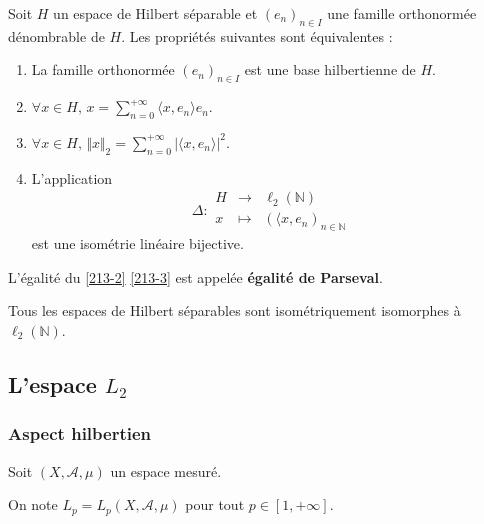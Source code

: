 	\begin{theorem}
		\label{213-2}
		Soit $H$ un espace de Hilbert séparable et $(e_n)_{n \in I}$ une famille orthonormée dénombrable de $H$. Les propriétés suivantes sont équivalentes :
		\begin{enumerate}[label=(\roman*)]
			\item La famille orthonormée $(e_n)_{n \in I}$ est une base hilbertienne de $H$.
			\item $\forall x \in H, \, x = \sum_{n=0}^{+\infty} \langle x, e_n \rangle e_n$.
			\item \label{213-3} $\forall x \in H, \, \Vert x \Vert_2 = \sum_{n=0}^{+\infty} \vert \langle x, e_n \rangle \vert^2$.
			\item L'application
			\[
			\Delta :
			\begin{array}{ccc}
				H &\rightarrow& \ell_2(\mathbb{N}) \\
				x &\mapsto& (\langle x, e_n)_{n \in \mathbb{N}}
			\end{array}
			\]
			est une isométrie linéaire bijective.
		\end{enumerate}
	\end{theorem}

	\begin{remark}
		L'égalité du \cref{213-2} \cref{213-3} est appelée \textbf{égalité de Parseval}.
	\end{remark}


	\begin{corollary}
		Tous les espaces de Hilbert séparables sont isométriquement isomorphes à $\ell_2(\mathbb{N})$.
	\end{corollary}

	\subsection{L'espace \texorpdfstring{$L_2$}{L₂}}

	\subsubsection{Aspect hilbertien}


	Soit $(X, \mathcal{A}, \mu)$ un espace mesuré.

	\begin{notation}
		On note $L_p = L_p(X, \mathcal{A}, \mu)$ pour tout $p \in [1, +\infty]$.
	\end{notation}

